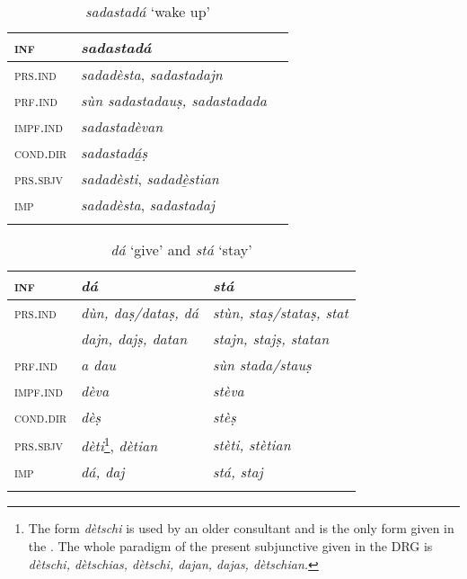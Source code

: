 \begin{table}
	\caption{\textit{\textit{sadastadá}} `wake up'}

	\begin{tabular}{lll}
		\lsptoprule
		\textsc{inf} & \textit{\textbf{sadastadá}}\\
		\midrule
		\textsc{prs.ind} & \textit{sadadèsta}, \textit{sadastadajn} \\
		\textsc{prf.ind} & \textit{sùn sadastadauṣ, sadastadada}\\
		\textsc{impf.ind} & \textit{sadastadèvan}\\
		\textsc{cond.dir} & \textit{sadastadá̱ṣ}\\
		\textsc{prs.sbjv} & \textit{sadadèsti}, \textit{sadadè̱stian}\\
		\textsc{imp} & \textit{sadadèsta}, \textit{sadastadaj}\\
		\lspbottomrule
	\end{tabular}
\end{table}



\begin{table}
	\caption{\textit{dá} `give' and \textit{stá} `stay'}

	\begin{tabular}{lll}
		\lsptoprule
		\textsc{inf} & \textit{\textbf{dá}} & \textit{\textbf{stá}}\\
		\midrule
		
		\textsc{prs.ind} & \textit{dùn, daṣ/dataṣ, dá} & \textit{stùn, staṣ/stataṣ, stat}\\
		& \textit{dajn, dajṣ, datan} & \textit{stajn, stajṣ, statan}\\
		\textsc{prf.ind} & \textit{a dau} & \textit{sùn stada/stauṣ}\\
		\textsc{impf.ind} & \textit{dèva} & \textit{stèva}\\
		\textsc{cond.dir} & \textit{dèṣ} & \textit{stèṣ}\\
		\textsc{prs.sbjv}	& \textit{dèti}\footnote{The form \textit{dètschi} is used by an older consultant and is the only form given in the \DRG{5}{65}. The whole paradigm of the present subjunctive given in the DRG is \textit{dètschi, dètschias, dètschi, dajan, dajas, dètschian.}}, \textit{dètian} & \textit{stèti, stètian}\\
		\textsc{imp} & \textit{dá, daj} & \textit{stá, staj}\\
		\lspbottomrule
	\end{tabular}
\end{table}


